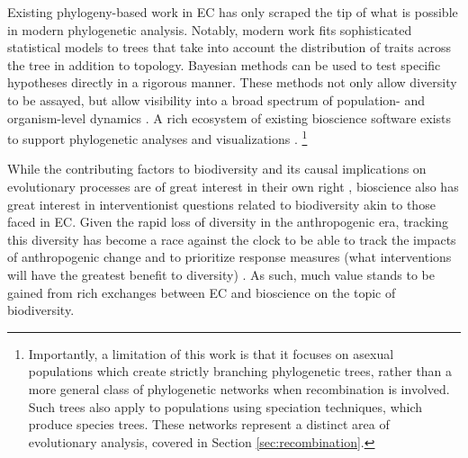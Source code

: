 Existing phylogeny-based work in EC has only scraped the tip of what is possible in modern phylogenetic analysis.
Notably, modern work fits sophisticated statistical models to trees that take into account the distribution of traits across the tree in addition to topology.
Bayesian methods can be used to test specific hypotheses directly in a rigorous manner.
These methods not only allow diversity to be assayed, but allow visibility into a broad spectrum of population- and organism-level dynamics \citep{genthon2023cell, levy2015quantitative,stadler2013recovering,moreno2025ecology,lewinsohn2023statedependent,nozoe2017inferring}.
A rich ecosystem of existing bioscience software exists to support phylogenetic analyses and visualizations \citep{moreno2024dendropy,talevich2012biophylo,huertacepas2016ete3,aton2026scikitbio,kelleher2019inferring,moshiri2025compacttree,moshiri2020treeswift,ryneches2018suchtree,eaton2019toytree,moreno2026phyloframe,paradis2018ape,lalejini2019data,yu2016ggtree,zanini2025iplotx,sanderson2022taxonium,vaughan2017icytree}.
\unskip\footnote{%
Importantly, a limitation of this work is that it focuses on asexual populations which create strictly branching phylogenetic trees, rather than a more general class of phylogenetic networks when recombination is involved.
Such trees also apply to populations using speciation techniques, which produce species trees.
These networks represent a distinct area of evolutionary analysis, covered in Section \ref{sec:recombination}.
}

While the contributing factors to biodiversity and its causal implications on evolutionary processes are of great interest in their own right \citep{fine2015ecological,stein2014environmental,rabosky2013diversitydependence}, bioscience also has great interest in interventionist questions related to biodiversity akin to those faced in EC.
Given the rapid loss of diversity in the anthropogenic era, tracking this diversity has become a race against the clock to be able to track the impacts of anthropogenic change and to prioritize response measures (what interventions will have the greatest benefit to diversity) \citep{pimm2014biodiversity,isaac2007mammals}.
As such, much value stands to be gained from rich exchanges between EC and bioscience on the topic of biodiversity.
